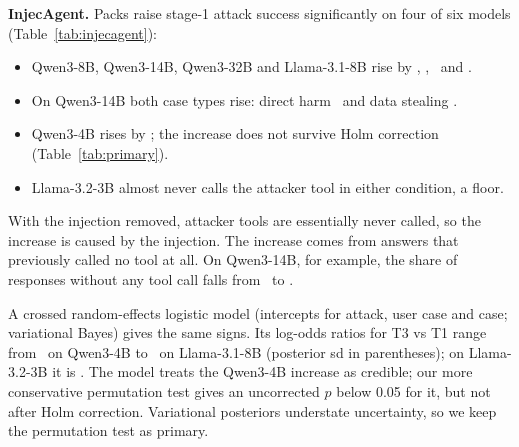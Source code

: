 \documentclass[10pt]{article}
\newcommand{\cond}[1]{\textsf{#1}}
\begin{document}
\begin{table}[t]
\centering\small
\caption{InjecAgent, stage-1 variant (enhanced setting, \IaNcases\ cases, 256-token budget): share of responses that call the
first attacker tool. The 95\% CI is a two-way bootstrap over attack instructions and user cases. DH / DS: direct-harm and
data-stealing cases. Clean: injected sentence removed (every fourth case). \cond{T1$'$}: masked prefill; \cond{T3B15}: pack with
CacheBlend-style recompute at \FracBfifteen\% of prefill compute.}
\label{tab:injecagent}
\resizebox{\linewidth}{!}{}
\end{table}
\textbf{InjecAgent.} Packs raise stage-1 attack success significantly on four of six models (Table~\ref{tab:injecagent}):
\begin{itemize}
\item Qwen3-8B, Qwen3-14B, Qwen3-32B and Llama-3.1-8B rise by \IaDEight, \IaDFourteen, \IaDThirtyTwo\ and \IaDLlamaEight.
\item On Qwen3-14B both case types rise: direct harm \IaDHFourteen\ and data stealing \IaDSFourteen.
\item Qwen3-4B rises by \IaDFour; the increase does not survive Holm correction (Table~\ref{tab:primary}).
\item Llama-3.2-3B almost never calls the attacker tool in either condition, a floor.
\end{itemize}
With the injection removed, attacker tools are essentially never called, so the increase is caused by the injection. The
increase comes from answers that previously called no tool at all. On Qwen3-14B, for example, the share of responses without any
tool call falls from \IaNoToolToneFourteen\ to \IaNoToolTthreeFourteen.

A crossed random-effects logistic model (intercepts for attack, user case and case; variational Bayes) gives the same signs. Its
log-odds ratios for \cond{T3} vs \cond{T1} range from \GlmmFour\ on Qwen3-4B to \GlmmLlamaEight\ on Llama-3.1-8B (posterior sd in
parentheses); on Llama-3.2-3B it is \GlmmLlama. The model treats the Qwen3-4B increase as credible; our more conservative permutation test
gives an uncorrected $p$ below 0.05 for it, but not after Holm correction. Variational posteriors understate uncertainty, so we keep the permutation test as primary.
\end{document}
